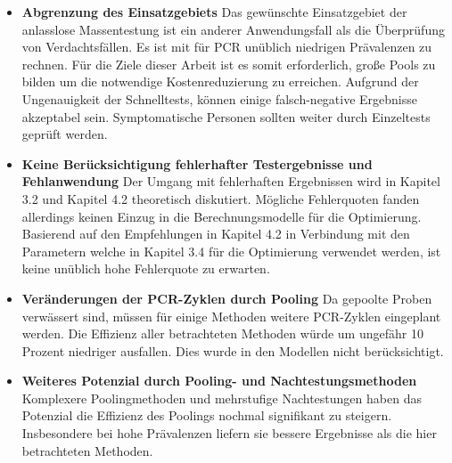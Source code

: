 \begin{itemize}
	\item\textbf{Abgrenzung des Einsatzgebiets}\newline
	Das gewünschte Einsatzgebiet der anlasslose Massentestung ist ein anderer Anwendungsfall als die Überprüfung von Verdachtsfällen.
	Es ist mit für PCR unüblich niedrigen Prävalenzen zu rechnen.
	Für die Ziele dieser Arbeit ist es somit erforderlich, große Pools zu bilden um die notwendige Kostenreduzierung zu erreichen.
	Aufgrund der Ungenauigkeit der Schnelltests, können einige falsch-negative Ergebnisse akzeptabel sein.
    Symptomatische Personen sollten weiter durch Einzeltests geprüft werden.
	\item\textbf{Keine Berücksichtigung fehlerhafter Testergebnisse und Fehlanwendung}\newline
	Der Umgang mit fehlerhaften Ergebnissen wird in Kapitel 3.2 und Kapitel 4.2 theoretisch diskutiert.
	Mögliche Fehlerquoten fanden allerdings keinen Einzug in die Berechnungsmodelle für die Optimierung.
	Basierend auf den Empfehlungen in Kapitel 4.2 in Verbindung mit den Parametern welche in Kapitel 3.4 für die Optimierung verwendet werden, ist keine unüblich hohe Fehlerquote zu erwarten.
	\item\textbf{Veränderungen der PCR-Zyklen durch Pooling}\newline
	Da gepoolte Proben verwässert sind, müssen für einige Methoden weitere PCR-Zyklen eingeplant werden.
	Die Effizienz aller betrachteten Methoden würde um ungefähr 10 Prozent niedriger ausfallen.
	Dies wurde in den Modellen nicht berücksichtigt.
	\item\textbf{Weiteres Potenzial durch Pooling- und Nachtestungsmethoden}\newline
	Komplexere Poolingmethoden und mehrstufige Nachtestungen haben das Potenzial die Effizienz des Poolings nochmal signifikant zu steigern.
	Insbesondere bei hohe Prävalenzen liefern sie bessere Ergebnisse als die hier betrachteten Methoden.
\end{itemize}
